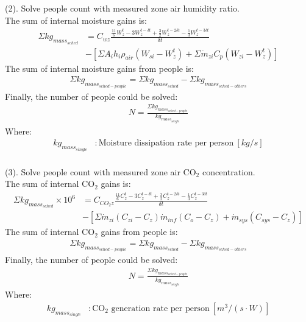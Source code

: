 \noindent (2). Solve people count with measured zone air humidity ratio. \\
\noindent The sum of internal moisture gains is:
\begin{align}
  \Sigma{kg_{mass_{sched}}} &= C_{wz}\frac {\frac{11}{6}W_{z}^{t}-3W_{z}^{t-\delta t}+\frac{3}{2}W_{z}^{t-2\delta t}-\frac{1}{3}W_{z}^{t-3\delta t}} {\delta t} \nonumber \\
  &-  [\Sigma{A_i h_i \rho_{air} (W_{si} - W_{z}^{t})} + \Sigma{\dot{m}_{zi} C_p (W_{zi}-W_{z}^{t})}]
\end{align}
The sum of internal moisture gains from people is:
\begin{align}
  \Sigma{kg_{mass_{sched-people}}} = \Sigma{kg_{mass_{sched}}} - \Sigma{kg_{mass_{sched-others}}}
\end{align}
Finally, the number of people could be solved:
\begin{align}
  N = \frac {\Sigma{kg_{mass_{sched-people}}}}{kg_{mass_{single}}}
\end{align}
Where:
\begin{align}
  kg_{mass_{single}} &: \text{Moisture dissipation rate per person} ~ [kg / s] \nonumber \\
\end{align}

\noindent (3). Solve people count with measured zone air CO$_2$ concentration. \\
\noindent The sum of internal CO$_2$ gains is:
\begin{align}
  \Sigma{kg_{mass_{sched}}}\times 10^{6} &= C_{CO_{2}z}\frac {\frac{11}{6}C_{z}^{t}-3C_{z}^{t-\delta t}+\frac{3}{2}C_{z}^{t-2\delta t}-\frac{1}{3}C_{z}^{t-3\delta t}} {\delta t} \nonumber \\
  &-  [\Sigma{\dot{m}_{zi}(C_{zi}-C_z)} \dot{m}_{inf} (C_o - C_z) + \dot{m}_{sys} (C_{sys} - C_z)]
\end{align}
The sum of internal CO$_2$ gains from people is:
\begin{align}
  \Sigma{kg_{mass_{sched-people}}} = \Sigma{kg_{mass_{sched}}} - \Sigma{kg_{mass_{sched-others}}}
\end{align}
Finally, the number of people could be solved:
\begin{align}
  N = \frac {\Sigma{kg_{mass_{sched-people}}}}{kg_{mass_{single}}}
\end{align}
Where:
\begin{align}
  kg_{mass_{single}} &: \text{CO$_2$ generation rate per person} ~ [m^{3}/(s \cdot W)] \nonumber \\
\end{align}

